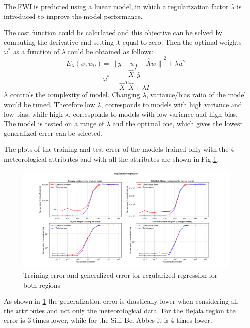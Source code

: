 \documentclass[10pt]{article}
\numberwithin{equation}{section}
\numberwithin{figure}{section}
\numberwithin{table}{section}
\begin{document}
The FWI is predicted using a linear model, in which a regularization factor $\lambda$ is introduced to improve the model performance.

The cost function could be calculated and this objective can be solved by computing the derivative and setting it equal to zero. Then the optimal weights $\omega^*$ as a function of $\lambda$ could be obtained as follows:
\begin{equation*}
    E_{\lambda}(w,w_0) = {\parallel y - w_0 - \hat{X}w \parallel}^2 + \lambda w^2
\end{equation*}
\begin{equation*}
    {\omega^*} = \frac{\hat{X}^T \hat{y}}{\hat{X}^T \hat{X} + {\lambda}I}
\end{equation*}
$\lambda$ controls the complexity of model. Changing $\lambda$, variance/bias ratio of the model would be tuned. Therefore low $\lambda$, corresponds to models with high variance and low bias, while high $\lambda$, corresponds to models with low variance and high bias.
The model is tested on a range of $\lambda$ and the optimal one, which gives the lowest generalized error can be selected.

The plots of the training and test error of the models trained only with the 4 meteorological attributes and with all the attributes are shown in Fig.\ref{regressA_comp}.

\begin{figure}[H]
    \centering
    \includegraphics[scale = 0.4]{Figures/regressionA_comparison_with_without_all_data_both_regions.png}
    \caption{Training error and generalized error for regularized regression for both regions}
    \label{regressA_comp}
\end{figure}
As shown in \ref{regressA_comp} the generalization error is drastically lower when considering all the attributes and not only the meteorological data. For the Bejaia region the error is 3 times lower, while for the Sidi-Bel-Abbes it is 4 times lower.
\end{document}
